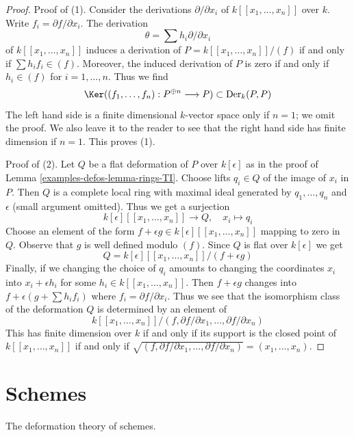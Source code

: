\begin{proof}
Proof of (1). Consider the derivations $\partial/\partial x_i$ of
$k[[x_1, \ldots, x_n]]$ over $k$. Write $f_i = \partial f/\partial x_i$.
The derivation
$$
\theta = \sum h_i \partial/\partial x_i
$$
of $k[[x_1, \ldots, x_n]]$
induces a derivation of $P = k[[x_1, \ldots, x_n]]/(f)$
if and only if
$\sum h_i f_i \in (f)$. Moreover, the induced derivation of $P$
is zero if and only if $h_i \in (f)$ for $i = 1, \ldots, n$.
Thus we find
$$
\Ker((f_1, \ldots, f_n) : P^{\oplus n} \longrightarrow P) \subset
\text{Der}_k(P, P)
$$
The left hand side is a finite dimensional $k$-vector space only if
$n = 1$; we omit the proof. We also leave it to the reader to see
that the right hand side has finite dimension if $n = 1$.
This proves (1).

\medskip\noindent
Proof of (2). Let $Q$ be a flat deformation of $P$ over $k[\epsilon]$
as in the proof of Lemma \ref{examples-defos-lemma-rings-TI}. Choose lifts $q_i \in Q$
of the image of $x_i$ in $P$. Then $Q$ is a complete local ring
with maximal ideal generated by $q_1, \ldots, q_n$ and $\epsilon$
(small argument omitted). Thus we get a surjection
$$
k[\epsilon][[x_1, \ldots, x_n]] \longrightarrow Q,\quad
x_i \longmapsto q_i
$$
Choose an element of the form
$f + \epsilon g \in k[\epsilon][[x_1, \ldots, x_n]]$
mapping to zero in $Q$. Observe that $g$ is well defined modulo $(f)$.
Since $Q$ is flat over $k[\epsilon]$ we get
$$
Q = k[\epsilon][[x_1, \ldots, x_n]]/(f + \epsilon g)
$$
Finally, if we changing the choice of $q_i$ amounts to
changing the coordinates $x_i$ into $x_i + \epsilon h_i$
for some $h_i \in k[[x_1, \ldots, x_n]]$. Then
$f + \epsilon g$ changes into $f + \epsilon (g + \sum h_i f_i)$
where $f_i = \partial f/\partial x_i$. Thus we see that the
isomorphism class of the deformation $Q$ is determined
by an element of
$$
k[[x_1, \ldots, x_n]]/
(f, \partial f/\partial x_1, \ldots,  \partial f/\partial x_n)
$$
This has finite dimension over $k$ if and only if
its support is the closed point of $k[[x_1, \ldots, x_n]]$
if and only if
$\sqrt{(f, \partial f/\partial x_1, \ldots,  \partial f/\partial x_n)} =
(x_1, \ldots, x_n)$.
\end{proof}

\section{Schemes}
\label{examples-defos-section-schemes}
The deformation theory of schemes.

